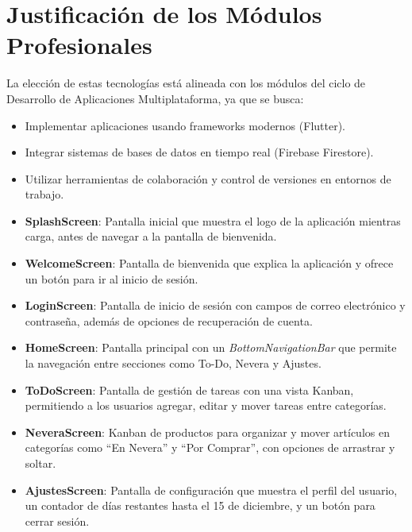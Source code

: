 \documentclass{article}
\begin{document}
\section{Justificación de los Módulos Profesionales}


La elección de estas tecnologías está alineada con los módulos del ciclo de Desarrollo de Aplicaciones Multiplataforma, ya que se busca:
\begin{itemize}
    \item Implementar aplicaciones usando frameworks modernos (Flutter).
    \item Integrar sistemas de bases de datos en tiempo real (Firebase Firestore).
    \item Utilizar herramientas de colaboración y control de versiones en entornos de trabajo.
\end{itemize}


\begin{itemize}
    \item \textbf{SplashScreen}: Pantalla inicial que muestra el logo de la aplicaci\'on mientras carga, antes de navegar a la pantalla de bienvenida.
    \item \textbf{WelcomeScreen}: Pantalla de bienvenida que explica la aplicaci\'on y ofrece un bot\'on para ir al inicio de sesi\'on.
    \item \textbf{LoginScreen}: Pantalla de inicio de sesi\'on con campos de correo electr\'onico y contrase\~na, adem\'as de opciones de recuperaci\'on de cuenta.
    \item \textbf{HomeScreen}: Pantalla principal con un \textit{BottomNavigationBar} que permite la navegaci\'on entre secciones como To-Do, Nevera y Ajustes.
    \item \textbf{ToDoScreen}: Pantalla de gesti\'on de tareas con una vista Kanban, permitiendo a los usuarios agregar, editar y mover tareas entre categor\'ias.
    \item \textbf{NeveraScreen}: Kanban de productos para organizar y mover art\'iculos en categor\'ias como ``En Nevera'' y ``Por Comprar'', con opciones de arrastrar y soltar.
    \item \textbf{AjustesScreen}: Pantalla de configuraci\'on que muestra el perfil del usuario, un contador de d\'ias restantes hasta el 15 de diciembre, y un bot\'on para cerrar sesi\'on.
\end{itemize}
\end{document}
